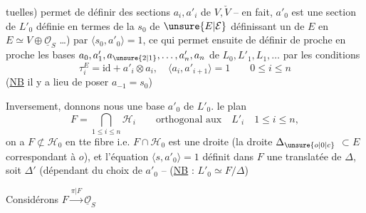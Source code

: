 %
tuelles) permet de définir des sections $a_i,a'_i$ de $V,\check V$ -- en fait, $a'_0$ est une section de $L'_0$ définie en termes de  la   $s_0$ de $\unsure{E|\mathcal E}$   définissant un  de $E$ en $E\simeq V\oplus\underline{\mathcal O}_S$ \ldots) par $\langle s_0,a'_0\rangle=1$, ce qui permet ensuite de définir de proche en proche les bases $a_0,a'_1,a_{\unsure{2|1}},\ldots,a'_n,a_n$ de $L_0,L'_1,L_1,\ldots$ par les conditions
\[
\tau_i^E=\mathrm{id}+a'_i\otimes a_i,\quad
\langle a_i,a'_{i+1}\rangle=1\qquad 0\leq i\leq n
\]
(\uline{NB} il y a lieu de poser $a_{-1}=s_0$)

Inversement, donnons nous une base $a'_0$ de $L'_0$.  le plan
\[
F=\bigcap_{1\leq i\leq n}\mathcal H_i\qquad
\text{orthogonal aux}\quad L'_i\quad 1\leq i\leq n,
\]
 on a  $F\not\subset\mathcal H_0$ en tte fibre i.e. $F\cap\mathcal H_0$ est une droite (la droite $\Delta_{\unsure{o|0|c}}$  $\subset E$ correspondant à $o$), et l'équation \deleted{$\unsure{\xi}$} $\langle s,a'_0\rangle=1$ définit dans $F$ une    translatée de $\Delta$, soit $\Delta'$ (dépendant du choix de $a'_0$ --  (\uline{NB} : $L'_0\simeq F/\Delta$)

Considérons $F\xrightarrow{\pi|F}\underline{\mathcal O}_S$
